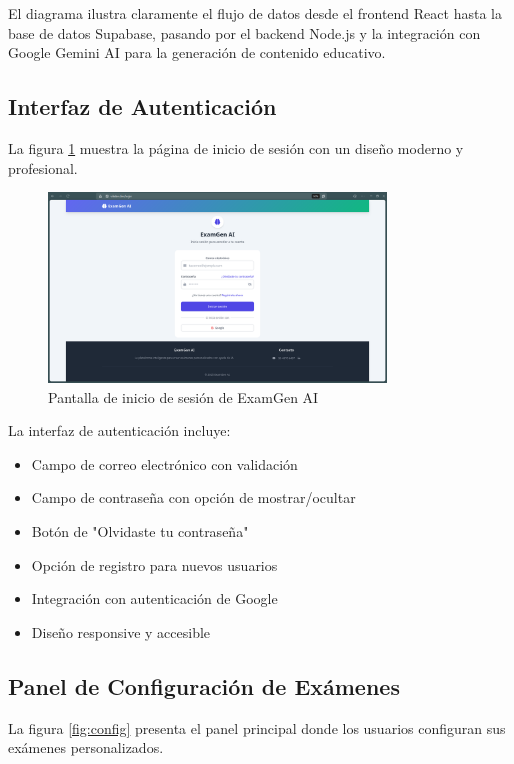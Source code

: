 \documentclass[12pt,a4paper]{report}
\begin{document}
El diagrama ilustra claramente el flujo de datos desde el frontend React hasta la base de datos Supabase, pasando por el backend Node.js y la integración con Google Gemini AI para la generación de contenido educativo.

\subsection{Interfaz de Autenticación}

La figura \ref{fig:login} muestra la página de inicio de sesión con un diseño moderno y profesional.

\begin{figure}[h]
\centering
\includegraphics[width=0.8\textwidth]{assets/250617_06h44m06s_screenshot.png}
\caption{Pantalla de inicio de sesión de ExamGen AI}
\label{fig:login}
\end{figure}

La interfaz de autenticación incluye:
\begin{itemize}
\item Campo de correo electrónico con validación
\item Campo de contraseña con opción de mostrar/ocultar
\item Botón de "Olvidaste tu contraseña"
\item Opción de registro para nuevos usuarios
\item Integración con autenticación de Google
\item Diseño responsive y accesible
\end{itemize}

\subsection{Panel de Configuración de Exámenes}

La figura \ref{fig:config} presenta el panel principal donde los usuarios configuran sus exámenes personalizados.
\end{document}
